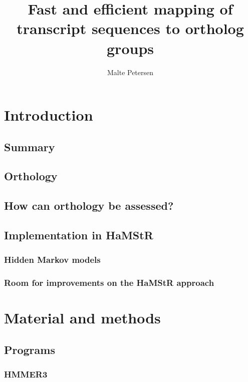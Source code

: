 \documentclass[a4paper]{scrreprt}
\title{Fast and efficient mapping of transcript sequences to ortholog groups}
\author{Malte Petersen}
\newcommand{\hamstr}{HaMStR\xspace}
\begin{document}
\maketitle
\tableofcontents



\chapter{Introduction}
	\section{Summary}
		
	\section{Orthology}
		
	\section{How can orthology be assessed?}
	\section{Implementation in \hamstr}
		\subsection{Hidden Markov models}
			
		\subsection{Room for improvements on the \hamstr approach}

\chapter{Material and methods}
	\section{Programs}
		
		\subsection{HMMER3}
			
\end{document}
